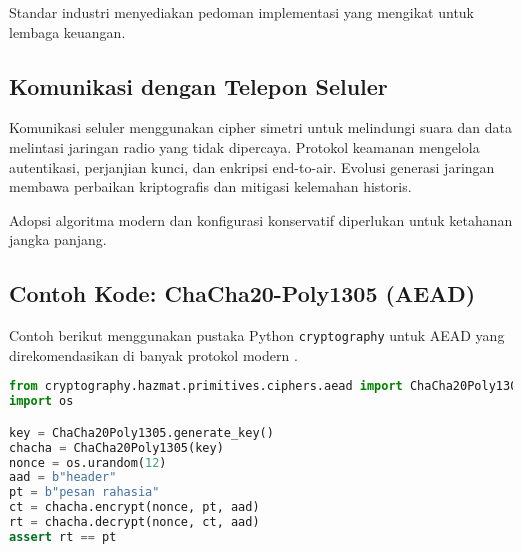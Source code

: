 \documentclass[../main.tex]{subfiles}
\begin{document}
Standar industri menyediakan pedoman implementasi yang mengikat untuk lembaga keuangan.

\subsection{Komunikasi dengan Telepon Seluler}
Komunikasi seluler menggunakan cipher simetri untuk melindungi suara dan data melintasi jaringan radio yang tidak dipercaya. Protokol keamanan mengelola autentikasi, perjanjian kunci, dan enkripsi end-to-air. Evolusi generasi jaringan membawa perbaikan kriptografis dan mitigasi kelemahan historis.

Adopsi algoritma modern dan konfigurasi konservatif diperlukan untuk ketahanan jangka panjang.

\subsection{Contoh Kode: ChaCha20-Poly1305 (AEAD)}
Contoh berikut menggunakan pustaka Python \texttt{cryptography} untuk AEAD yang direkomendasikan di banyak protokol modern \parencite{rfc8439}.

\begin{lstlisting}[language=Python, caption={ChaCha20-Poly1305 AEAD}, label={lst:chacha20}]
from cryptography.hazmat.primitives.ciphers.aead import ChaCha20Poly1305
import os

key = ChaCha20Poly1305.generate_key()
chacha = ChaCha20Poly1305(key)
nonce = os.urandom(12)
aad = b"header"
pt = b"pesan rahasia"
ct = chacha.encrypt(nonce, pt, aad)
rt = chacha.decrypt(nonce, ct, aad)
assert rt == pt
\end{lstlisting}
\end{document}
